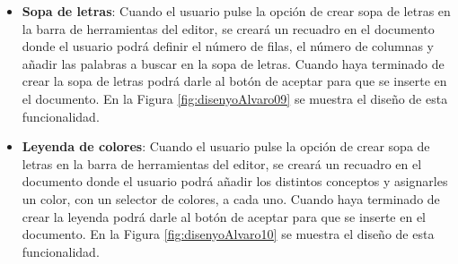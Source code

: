 \begin{itemize}
  \item \textbf{Sopa de letras}: Cuando el usuario pulse la opción de crear sopa de letras en la barra de herramientas del editor, 
  se creará un recuadro en el documento donde el usuario podrá definir el número de filas, el número de columnas y añadir las palabras a buscar en la sopa de letras. Cuando haya terminado de crear la sopa de letras podrá darle al botón de aceptar para que se inserte en el documento. En la Figura \ref{fig:disenyoAlvaro09} se muestra el diseño de esta funcionalidad.
  \item \textbf{Leyenda de colores}: Cuando el usuario pulse la opción de crear sopa de letras en la barra de herramientas del editor, se creará un recuadro en el documento donde el usuario podrá añadir los distintos conceptos y asignarles un color, con un selector de colores, a cada uno. Cuando haya terminado de crear la leyenda podrá darle al botón de aceptar para que se inserte en el documento. En la Figura \ref{fig:disenyoAlvaro10} se muestra el diseño de esta funcionalidad.
\end{itemize}

